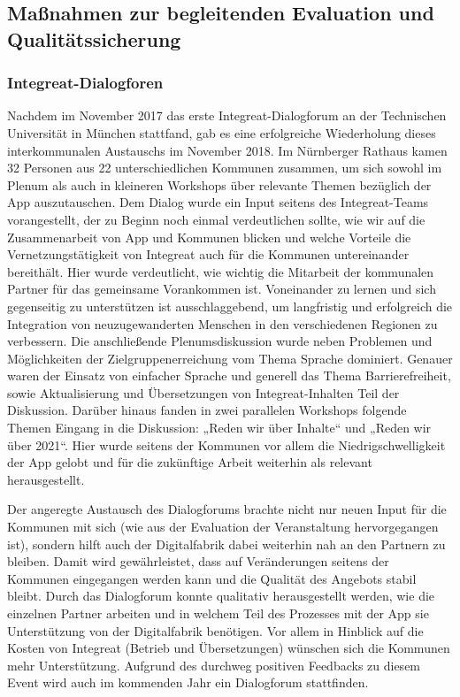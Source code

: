 \documentclass[12pt, a4paper]{article} %
\begin{document}
\hypertarget{mauxdfnahmen-zur-begleitenden-evaluation-und-qualituxe4tssicherung}{%
\subsection{Maßnahmen zur begleitenden Evaluation und
Qualitätssicherung}\label{mauxdfnahmen-zur-begleitenden-evaluation-und-qualituxe4tssicherung}}

\hypertarget{integreat-dialogforen}{%
\subsubsection{Integreat-Dialogforen}\label{integreat-dialogforen}}

Nachdem im November 2017 das erste Integreat-Dialogforum an der
Technischen Universität in München stattfand, gab es eine erfolgreiche
Wiederholung dieses interkommunalen Austauschs im November 2018. Im
Nürnberger Rathaus kamen 32 Personen aus 22 unterschiedlichen Kommunen
zusammen, um sich sowohl im Plenum als auch in kleineren Workshops über
relevante Themen bezüglich der App auszutauschen. Dem Dialog wurde ein
Input seitens des Integreat-Teams vorangestellt, der zu Beginn noch
einmal verdeutlichen sollte, wie wir auf die Zusammenarbeit von App und
Kommunen blicken und welche Vorteile die Vernetzungstätigkeit von
Integreat auch für die Kommunen untereinander bereithält. Hier wurde
verdeutlicht, wie wichtig die Mitarbeit der kommunalen Partner für das
gemeinsame Vorankommen ist. Voneinander zu lernen und sich gegenseitig
zu unterstützen ist ausschlaggebend, um langfristig und erfolgreich die
Integration von neuzugewanderten Menschen in den verschiedenen Regionen
zu verbessern. Die anschließende Plenumsdiskussion wurde neben Problemen
und Möglichkeiten der Zielgruppenerreichung vom Thema Sprache dominiert.
Genauer waren der Einsatz von einfacher Sprache und generell das Thema
Barrierefreiheit, sowie Aktualisierung und Übersetzungen von
Integreat-Inhalten Teil der Diskussion. Darüber hinaus fanden in zwei
parallelen Workshops folgende Themen Eingang in die Diskussion: „Reden
wir über Inhalte“ und „Reden wir über 2021“. Hier wurde seitens der
Kommunen vor allem die Niedrigschwelligkeit der App gelobt und für die
zukünftige Arbeit weiterhin als relevant herausgestellt.

Der angeregte Austausch des Dialogforums brachte nicht nur neuen Input
für die Kommunen mit sich (wie aus der Evaluation der Veranstaltung
hervorgegangen ist), sondern hilft auch der Digitalfabrik dabei
weiterhin nah an den Partnern zu bleiben. Damit wird gewährleistet, dass
auf Veränderungen seitens der Kommunen eingegangen werden kann und die
Qualität des Angebots stabil bleibt. Durch das Dialogforum konnte
qualitativ herausgestellt werden, wie die einzelnen Partner arbeiten und
in welchem Teil des Prozesses mit der App sie Unterstützung von der
Digitalfabrik benötigen. Vor allem in Hinblick auf die Kosten von
Integreat (Betrieb und Übersetzungen) wünschen sich die Kommunen mehr
Unterstützung. Aufgrund des durchweg positiven Feedbacks zu diesem Event
wird auch im kommenden Jahr ein Dialogforum stattfinden.
\end{document}
